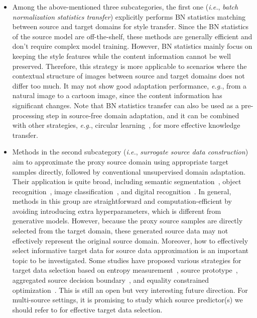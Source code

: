 \documentclass[10pt,journal,compsoc]{IEEEtran}
\def\eg{{\em e.g.}}
\def\ie{{\em i.e.}}
\begin{document}
\begin{itemize}[leftmargin=*]%
\item Among the above-mentioned three subcategories, the first one (\ie, \emph{batch normalization statistics transfer}) explicitly performs BN statistics matching between source and target domains for style transfer.
Since the BN statistics of the source model are off-the-shelf, these methods are generally efficient and don't require complex model training.
However, BN statistics mainly focus on keeping the style features while the content information cannot be well preserved.
Therefore, this strategy is more applicable to scenarios where the contextual structure of images between source and target domains does not differ too much. %
It may not show good adaptation performance, \eg, from a natural image to a cartoon image, since the content information has significant changes.
Note that BN statistics transfer can also be used as a pre-processing step in source-free domain adaptation, and it can be combined with other strategies, \eg, circular learning~\cite{hong2022source}, for more effective knowledge transfer.


\item Methods in the second subcategory (\ie, \emph{surrogate source data construction}) aim to approximate the proxy source domain using appropriate target samples directly, followed by conventional unsupervised domain adaptation.
Their application is quite broad, including semantic segmentation~\cite{ye2021source}, object recognition~\cite{ding2022proxymix, du2021generation, yao2021sourcesurro}, image classification~\cite{tian2021source}, and digital recognition~\cite{tian2021source, du2021generation}.
In general, methods in this group are straightforward and computation-efficient by avoiding introducing extra hyperparameters, which is different from generative models.
However, because the proxy source samples are directly selected from the target domain, these generated source data may not
effectively represent the original source domain.
Moreover, how to effectively select informative target data for source data approximation is an important topic to be investigated.
Some studies have proposed various strategies for target data selection %
based on entropy measurement~\cite{ye2021source}, source prototype~\cite{ding2022proxymix, du2021generation}, aggregated source decision boundary~\cite{tian2021source}, and equality constrained optimization~\cite{yao2021sourcesurro}.
This is still an open but very interesting future direction. 
For multi-source settings, it is promising to study which source predictor(s) we should refer to for effective target data selection.


\end{itemize}
\end{document}
